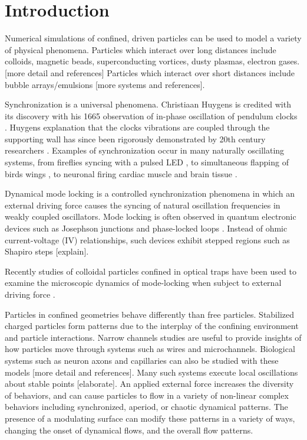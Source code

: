 \documentclass[prb,preprint]{revtex4}
\begin{document}
\section{Introduction} %
%
Numerical simulations of confined, driven particles
can be used to model a variety of physical phenomena.
Particles which interact over long distances
include colloids, magnetic beads, superconducting vortices, dusty plasmas, electron gases. [more detail and references]
Particles which interact over short distances include
bubble arrays/emulsions [more systems and references].

Synchronization is a universal phenomena. 
Christiaan Huygens is credited with its discovery
with his 1665 observation of
in-phase oscillation of pendulum clocks \cite{Pikovsky2003}.  
Huygens explanation
that the clocks vibrations are coupled through the supporting
wall has since been rigorously demonstrated by 20th century
researchers \cite{Ramirez2016}.
Examples of synchronization occur
in many naturally oscillating systems,
from fireflies syncing with a pulsed LED \cite{},
to simultaneous flapping of birds wings \cite{},
to neuronal firing cardiac muscle \cite{} and brain tissue \cite{}.

Dynamical mode locking is a controlled 
synchronization phenomena in 
which an external driving force
causes the syncing of natural oscillation frequencies
in
weakly coupled oscillators.
Mode locking is often observed in quantum electronic
devices such as Josephson junctions \cite{}
and phase-locked loops \cite{}.
Instead of ohmic current-voltage (IV) relationships,
such devices exhibit stepped regions
such as Shapiro steps \cite{} [explain].

Recently studies of colloidal particles confined
in optical traps have
been used to examine the microscopic dynamics
of mode-locking when subject to external driving force \cite{juniper2015}.


Particles in confined geometries behave differently than free particles.
Stabilized charged particles form patterns
due to the interplay of the confining environment
and particle interactions.
Narrow channels studies are useful to provide insights 
of how particles move through systems 
such as wires and microchannels.
Biological systems such as
neuron axons and capillaries can also be studied
with these models [more detail and references].
Many such systems execute local oscillations
about stable points [elaborate].
An applied external force
increases the diversity of behaviors,
and can cause particles to flow in
a variety of non-linear complex behaviors
including
synchronized, aperiod, or chaotic dynamical patterns.
%
The presence of a modulating surface
can modify these patterns in a variety of ways,
changing the onset of dynamical flows,
and the overall flow patterns.
\end{document}

